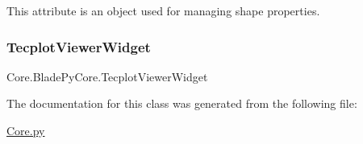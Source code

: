 This attribute is an object used for managing shape properties. 

\hypertarget{a00078_a04f16a810669c721b389767d47c08c8f}{}\label{a00078_a04f16a810669c721b389767d47c08c8f} 
\subsubsection{\texorpdfstring{Tecplot\+Viewer\+Widget}{TecplotViewerWidget}}
{\footnotesize\ttfamily Core.\+Blade\+Py\+Core.\+Tecplot\+Viewer\+Widget}



The documentation for this class was generated from the following file\+:\begin{DoxyCompactItemize}
\item 
\hyperlink{a00011}{Core.\+py}\end{DoxyCompactItemize}
